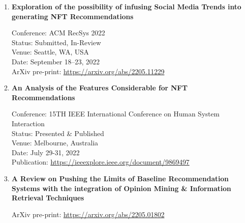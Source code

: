 \begin{enumerate}
\item \textbf{Exploration of the possibility of infusing Social Media Trends into generating NFT Recommendations}

Conference: ACM RecSys 2022 \\
Status: Submitted, In-Review \\
Venue: Seattle, WA, USA \\
Date: September 18–23, 2022 \\
ArXiv pre-print: \url{https://arxiv.org/abs/2205.11229} \\

\item \textbf{An Analysis of the Features Considerable for NFT Recommendations}

Conference: 15TH IEEE International Conference on Human System Interaction \\
Status: Presented \& Published \\
Venue: Melbourne, Australia\\
Date: July 29-31, 2022 \\
Publication: \url{https://ieeexplore.ieee.org/document/9869497} \\

\item \textbf{A Review on Pushing the Limits of Baseline Recommendation Systems with the integration of Opinion Mining \& Information Retrieval Techniques}

ArXiv pre-print: \url{https://arxiv.org/abs/2205.01802} \\

\end{enumerate}
